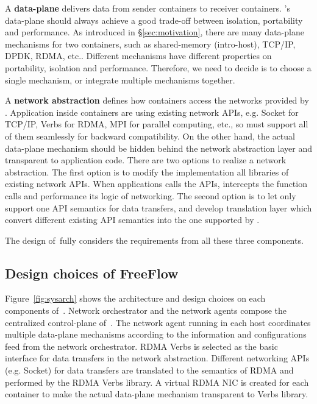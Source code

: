 A \textbf{data-plane} delivers data from sender containers to receiver 
containers. \sysname's data-plane should always achieve a good trade-off
between isolation, portability and performance. 
As introduced in \S\ref{sec:motivation}, there are many data-plane mechanisms
for two containers, such as shared-memory (intro-host), TCP/IP, DPDK, RDMA, etc..
Different mechanisms have different properties on portability, isolation and 
performance. Therefore, we need to decide is to choose a single mechanism, or
integrate multiple mechanisms together.

A \textbf{network abstraction} defines how containers access the networks
provided by \sysname. Application inside containers are using existing 
network APIs, e.g. Socket for TCP/IP, Verbs for RDMA, MPI for parallel computing, etc., so \sysname must support all of them seamlessly for 
backward compatibility. On the other hand, the actual data-plane mechanism
should be hidden behind the network abstraction layer and transparent to 
application code. There are two options to realize a network abstraction.
The first option is to modify the implementation all libraries of existing
network APIs. When applications calls the APIs, \sysname intercepts
the function calls and performance its logic of networking. 
The second option is to let \sysname only support one API semantics for
data transfers, and develop translation layer which convert different
existing API semantics into the one supported by \sysname.

The design of~\sysname fully considers the requirements from all these three
components.

\subsection{Design choices of FreeFlow}

Figure~\ref{fig:sysarch} shows the architecture and design choices on each 
components of~\sysname. Network orchestrator and the network agents compose 
the centralized control-plane of~\sysname. The network agent running in each 
host coordinates multiple data-plane mechanisms according to the information and 
configurations feed from the network orchestrator. RDMA Verbs is selected as 
the basic interface for data transfers in the network abstraction.  Different networking APIs (e.g. Socket) for data
transfers are translated to the semantics of RDMA and performed by the RDMA
Verbs library. A virtual RDMA NIC is created for each container to make the
actual data-plane mechanism transparent to Verbs library.

